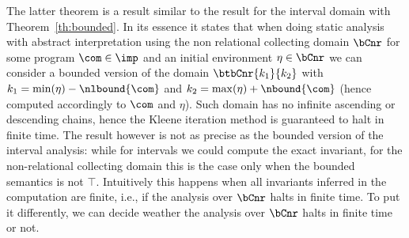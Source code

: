 The latter theorem is a result similar to the result for the interval
domain with Theorem~\ref{th:bounded}. In its essence it states that
when doing static analysis with abstract interpretation using the non
relational collecting domain \(\bCnr\) for some program
\(\com\in\imp\) and an initial environment \(\eta \in \bCnr\) we can
consider a bounded version of the domain \(\btbCnr{k_1}{k_2}\) with
\(k_1 = \min(\eta) - \nlbound{\com}\) and
\(k_2 = \max(\eta) + \nbound{\com}\) (hence computed accordingly to
\(\com\) and \(\eta\)). Such domain has no infinite ascending or
descending chains, hence the Kleene iteration method is guaranteed to
halt in finite time. The result however is not as precise as the
bounded version of the interval analysis: while for intervals we could
compute the exact invariant, for the non-relational collecting domain
this is the case only when the bounded semantics is not
\(\top\). Intuitively this happens when all invariants inferred in the
computation are finite, i.e., if the analysis over \(\bCnr\) halts in
finite time. To put it differently, we can decide weather the analysis
over \(\bCnr\) halts in finite time or not.
